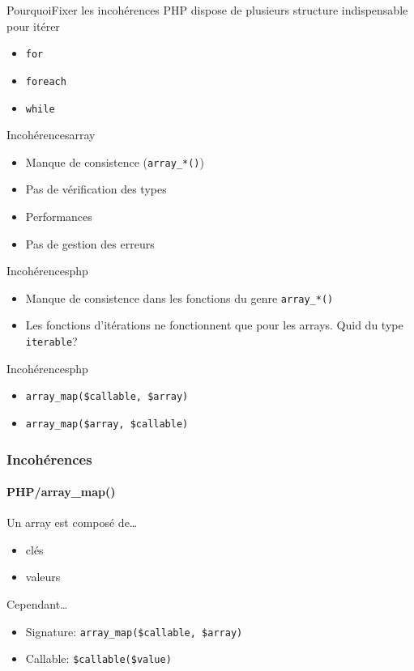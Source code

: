 \begin{frame}{Pourquoi}{Fixer les incohérences}
    PHP dispose de plusieurs structure indispensable pour itérer

    \begin{itemize}[<+->]
        \item \texttt{for}
        \item \texttt{foreach}
        \item \texttt{while}
    \end{itemize}
\end{frame}

\begin{frame}{Incohérences}{array}
    \begin{itemize}[<+->]
        \item Manque de consistence (\texttt{array\_*()})
        \item Pas de vérification des types
        \item Performances
        \item Pas de gestion des erreurs
    \end{itemize}
\end{frame}

\begin{frame}{Incohérences}{php}
    \begin{itemize}[<+->]
        \item Manque de consistence dans les fonctions du genre \texttt{array\_*()}
        \item Les fonctions d'itérations ne fonctionnent que pour les arrays. Quid du type \texttt{iterable}?
    \end{itemize}
\end{frame}

\begin{frame}{Incohérences}{php}
    \begin{itemize}[<+->]
        \item \texttt{array\_map(\$callable, \$array)}
        \item \texttt{array\_map(\$array, \$callable)}
    \end{itemize}
\end{frame}

\begin{frame}
	\frametitle{Incohérences}
    \framesubtitle{PHP/array\_map()}

    Un array est composé de\ldots

    \begin{itemize}[<+->]
        \item clés
        \item valeurs
    \end{itemize}

    \pause

    Cependant\ldots

    \pause

    \begin{itemize}[<+->]
        \item Signature: \texttt{array\_map(\$callable, \$array)}
        \item Callable: \texttt{\$callable(\$value)}
    \end{itemize}
\end{frame}

